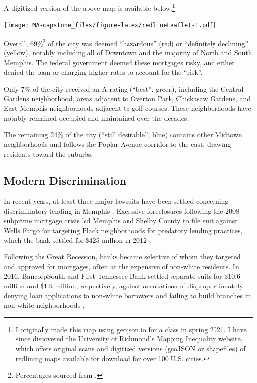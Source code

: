 \documentclass[
]{book}
\begin{document}
A digitized version of the above map is available below.\footnote{I originally made this map using \href{https://geojson.io/}{geojson.io} for a class in spring 2021. I have since discovered the University of Richmond's \href{https://dsl.richmond.edu/panorama/redlining/\#loc=5/39.1/-94.58}{Mapping Inequality} website, which offers original scans and digitized versions (geoJSON or shapefiles) of redlining maps available for download for over 100 U.S. cities.}

\texttt{[image: MA-capstone\_files/figure-latex/redlineLeaflet-1.pdf]}

Overall, 69\%\footnote{Percentages sourced from \citep{nelson}.} of the city was deemed ``hazardous'' (red) or ``definitely declining'' (yellow), notably including all of Downtown and the majority of North and South Memphis. The federal government deemed these mortgages risky, and either denied the loan or charging higher rates to account for the ``risk''.

Only 7\% of the city received an A rating (``best'', green), including the Central Gardens neighborhood, areas adjacent to Overton Park, Chickasaw Gardens, and East Memphis neighborhoods adjacent to golf courses. These neighborhoods have notably remained occupied and maintained over the decades.

The remaining 24\% of the city (``still desirable'', blue) contains other Midtown neighborhoods and follows the Poplar Avenue corridor to the east, drawing residents toward the suburbs.

\hypertarget{modern-discrimination}{%
\subsection{Modern Discrimination}\label{modern-discrimination}}

In recent years, at least three major lawsuits have been settled concerning discriminatory lending in Memphis \citep{bradley2019, uhlmann2020}. Excessive foreclosures following the 2008 subprime mortgage crisis led Memphis and Shelby County to file suit against Wells Fargo for targeting Black neighborhoods for predatory lending practices, which the bank settled for \$425 million in 2012 \citep{rothacker2012}.

Following the Great Recession, banks became selective of whom they targeted and approved for mortgages, often at the expensive of non-white residents. In 2016, BancorpSouth and First Tennessee Bank settled separate suits for \$10.6 million and \$1.9 million, respectively, against accusations of disproportionately denying loan applications to non-white borrowers and failing to build branches in non-white neighborhoods \citep{lane2016a, lane2016}.
\end{document}
